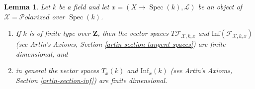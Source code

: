 \documentclass{stacks-project}
\theoremstyle{plain}
\newtheorem{lemma}[subsection]{Lemma}
\theoremstyle{definition}
\theoremstyle{remark}
\numberwithin{equation}{subsection}
\def\Spec{\mathop{\mathrm{Spec}}}
\def\Polarizedstack{\mathcal{P}\!\mathit{olarized}}
\begin{document}
\begin{lemma}
\label{lemma-polarized-tangent-space}
Let $k$ be a field and let $x = (X \to \Spec(k), \mathcal{L})$
be an object of $\mathcal{X} = \Polarizedstack$ over $\Spec(k)$.
\begin{enumerate}
\item If $k$ is of finite type over $\mathbf{Z}$, then
the vector spaces $T\mathcal{F}_{\mathcal{X}, k, x}$ and
$\text{Inf}(\mathcal{F}_{\mathcal{X}, k, x})$
(see Artin's Axioms, Section \ref{artin-section-tangent-spaces})
are finite dimensional, and
\item in general the vector spaces $T_x(k)$ and $\text{Inf}_x(k)$
(see Artin's Axioms, Section \ref{artin-section-inf})
are finite dimensional.
\end{enumerate}
\end{lemma}
\end{document}
